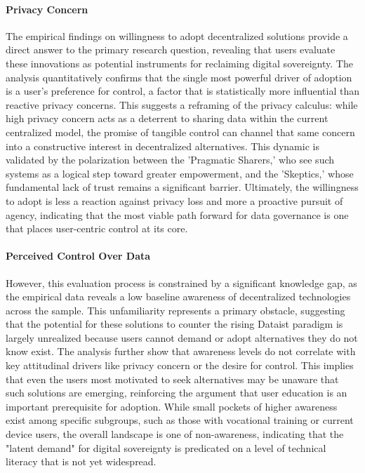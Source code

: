 	\paragraph{Privacy Concern}
	The empirical findings on willingness to adopt decentralized solutions provide a direct answer to the primary research question, revealing that users evaluate these innovations as potential instruments for reclaiming digital sovereignty. The analysis quantitatively confirms that the single most powerful driver of adoption is a user's preference for control, a factor that is statistically more influential than reactive privacy concerns. This suggests a reframing of the privacy calculus: while high privacy concern acts as a deterrent to sharing data within the current centralized model, the promise of tangible control can channel that same concern into a constructive interest in decentralized alternatives. This dynamic is validated by the polarization between the 'Pragmatic Sharers,' who see such systems as a logical step toward greater empowerment, and the 'Skeptics,' whose fundamental lack of trust remains a significant barrier. Ultimately, the willingness to adopt is less a reaction against privacy loss and more a proactive pursuit of agency, indicating that the most viable path forward for data governance is one that places user-centric control at its core.

	\paragraph{Perceived Control Over Data}
	However, this evaluation process is constrained by a significant knowledge gap, as the empirical data reveals a low baseline awareness of decentralized technologies across the sample. This unfamiliarity represents a primary obstacle, suggesting that the potential for these solutions to counter the rising Dataist paradigm is largely unrealized because users cannot demand or adopt alternatives they do not know exist. The analysis further show that awareness levels do not correlate with key attitudinal drivers like privacy concern or the desire for control. This implies that even the users most motivated to seek alternatives may be unaware that such solutions are emerging, reinforcing the argument that user education is an important prerequisite for adoption. While small pockets of higher awareness exist among specific subgroups, such as those with vocational training or current device users, the overall landscape is one of non-awareness, indicating that the "latent demand" for digital sovereignty is predicated on a level of technical literacy that is not yet widespread.

